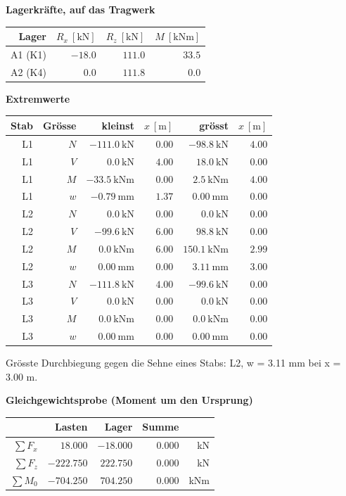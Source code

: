 \documentclass[11pt,a4paper]{article}
\begin{document}
\noindent\textbf{Lagerkräfte, auf das Tragwerk}
\begin{longtable}{rrrr}
\hline
Lager & $R_x\ [\mathrm{kN}]$ & $R_z\ [\mathrm{kN}]$ & $M\ [\mathrm{kNm}]$ \\
\hline
\endhead
A1 (K1) & $-18.0$ & $111.0$ & $33.5$ \\
A2 (K4) & $0.0$ & $111.8$ & $0.0$ \\
\hline
\end{longtable}
\noindent\textbf{Extremwerte}
\begin{longtable}{rrrrrr}
\hline
Stab & Grösse & kleinst & $x\ [\mathrm{m}]$ & grösst & $x\ [\mathrm{m}]$ \\
\hline
\endhead
L1 & $N$ & $-111.0\ \mathrm{kN}$ & $0.00$ & $-98.8\ \mathrm{kN}$ & $4.00$ \\
L1 & $V$ & $0.0\ \mathrm{kN}$ & $4.00$ & $18.0\ \mathrm{kN}$ & $0.00$ \\
L1 & $M$ & $-33.5\ \mathrm{kNm}$ & $0.00$ & $2.5\ \mathrm{kNm}$ & $4.00$ \\
L1 & $w$ & $-0.79\ \mathrm{mm}$ & $1.37$ & $0.00\ \mathrm{mm}$ & $0.00$ \\
L2 & $N$ & $0.0\ \mathrm{kN}$ & $0.00$ & $0.0\ \mathrm{kN}$ & $0.00$ \\
L2 & $V$ & $-99.6\ \mathrm{kN}$ & $6.00$ & $98.8\ \mathrm{kN}$ & $0.00$ \\
L2 & $M$ & $0.0\ \mathrm{kNm}$ & $6.00$ & $150.1\ \mathrm{kNm}$ & $2.99$ \\
L2 & $w$ & $0.00\ \mathrm{mm}$ & $0.00$ & $3.11\ \mathrm{mm}$ & $3.00$ \\
L3 & $N$ & $-111.8\ \mathrm{kN}$ & $4.00$ & $-99.6\ \mathrm{kN}$ & $0.00$ \\
L3 & $V$ & $0.0\ \mathrm{kN}$ & $0.00$ & $0.0\ \mathrm{kN}$ & $0.00$ \\
L3 & $M$ & $0.0\ \mathrm{kNm}$ & $0.00$ & $0.0\ \mathrm{kNm}$ & $0.00$ \\
L3 & $w$ & $0.00\ \mathrm{mm}$ & $0.00$ & $0.00\ \mathrm{mm}$ & $0.00$ \\
\hline
\end{longtable}
Grösste Durchbiegung gegen die Sehne eines Stabs: L2, w = 3.11 mm bei x = 3.00 m.

\noindent\textbf{Gleichgewichtsprobe (Moment um den Ursprung)}
\begin{longtable}{rrrrr}
\hline
 & Lasten & Lager & Summe &  \\
\hline
\endhead
$\sum F_x$ & $18.000$ & $-18.000$ & $0.000$ & kN \\
$\sum F_z$ & $-222.750$ & $222.750$ & $0.000$ & kN \\
$\sum M_0$ & $-704.250$ & $704.250$ & $0.000$ & kNm \\
\hline
\end{longtable}
\end{document}
